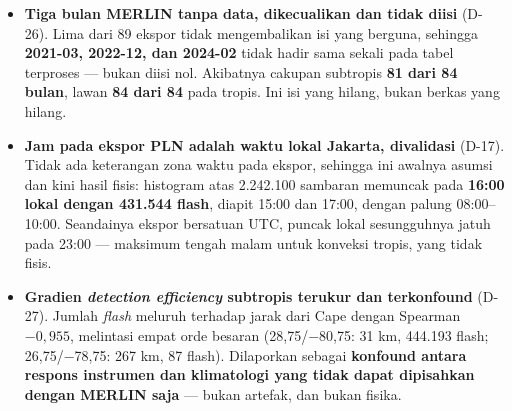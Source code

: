 
\begin{itemize}
    \item \textbf{Tiga bulan MERLIN tanpa data, dikecualikan dan tidak diisi}
          (D-26). Lima dari 89 ekspor tidak mengembalikan isi yang berguna,
          sehingga \textbf{2021-03, 2022-12, dan 2024-02} tidak hadir sama
          sekali pada tabel terproses --- bukan diisi nol. Akibatnya cakupan
          subtropis \textbf{81 dari 84 bulan}, lawan \textbf{84 dari 84} pada
          tropis. Ini isi yang hilang, bukan berkas yang hilang.
    \item \textbf{Jam pada ekspor PLN adalah waktu lokal Jakarta, divalidasi}
          (D-17). Tidak ada keterangan zona waktu pada ekspor, sehingga ini
          awalnya asumsi dan kini hasil fisis: histogram atas 2.242.100
          sambaran memuncak pada \textbf{16:00 lokal dengan 431.544 flash},
          diapit 15:00 dan 17:00, dengan palung 08:00--10:00. Seandainya ekspor
          bersatuan UTC, puncak lokal sesungguhnya jatuh pada 23:00 --- maksimum
          tengah malam untuk konveksi tropis, yang tidak fisis.
    \item \textbf{Gradien \textit{detection efficiency} subtropis terukur dan
          terkonfound} (D-27). Jumlah \textit{flash} meluruh terhadap jarak dari
          Cape dengan Spearman $-0,955$, melintasi empat orde besaran
          (28,75/$-$80,75: 31 km, 444.193 flash; 26,75/$-$78,75: 267 km, 87
          flash). Dilaporkan sebagai \textbf{konfound antara respons instrumen
          dan klimatologi yang tidak dapat dipisahkan dengan MERLIN saja} ---
          bukan artefak, dan bukan fisika.
\end{itemize}


